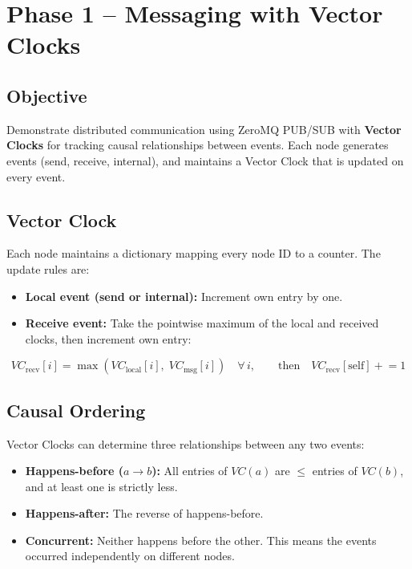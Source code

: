 \documentclass[12pt, a4paper]{article}
\begin{document}
\section{Phase 1 -- Messaging with Vector Clocks}

\subsection{Objective}

Demonstrate distributed communication using ZeroMQ PUB/SUB with \textbf{Vector Clocks} for tracking causal relationships between events. Each node generates events (send, receive, internal), and maintains a Vector Clock that is updated on every event.

\subsection{Vector Clock}

Each node maintains a dictionary mapping every node ID to a counter. The update rules are:

\begin{itemize}
    \item \textbf{Local event (send or internal):} Increment own entry by one.
    \item \textbf{Receive event:} Take the pointwise maximum of the local and received clocks, then increment own entry:
\end{itemize}

\[
VC_{\text{recv}}[i] = \max(VC_{\text{local}}[i],\; VC_{\text{msg}}[i]) \quad \forall\, i, \qquad \text{then}\quad VC_{\text{recv}}[\text{self}] \mathrel{+}= 1
\]

\subsection{Causal Ordering}

Vector Clocks can determine three relationships between any two events:

\begin{itemize}
    \item \textbf{Happens-before ($a \to b$):} All entries of $VC(a)$ are $\le$ entries of $VC(b)$, and at least one is strictly less.
    \item \textbf{Happens-after:} The reverse of happens-before.
    \item \textbf{Concurrent:} Neither happens before the other. This means the events occurred independently on different nodes.
\end{itemize}
\end{document}
